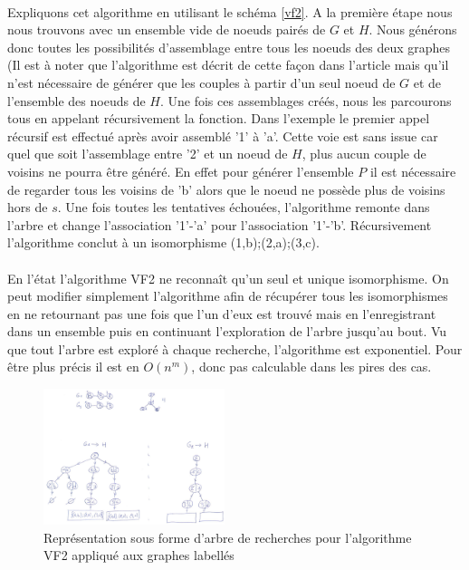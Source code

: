 \documentclass[12pt,french,twoside]{report}
\begin{document}
\paragraph{}Expliquons cet algorithme en utilisant le schéma \ref{vf2}.
A la première étape nous nous trouvons avec un ensemble vide de noeuds pairés de $G$ et $H$.
Nous générons donc toutes les possibilités d'assemblage entre tous les noeuds des deux graphes (Il est à noter que l'algorithme
est décrit de cette façon dans l'article mais qu'il n'est nécessaire de générer que les couples à partir d'un seul noeud de $G$
et de l'ensemble des noeuds de $H$.
Une fois ces assemblages créés, nous les parcourons tous en appelant récursivement la fonction.
Dans l'exemple le premier appel récursif est effectué après avoir assemblé '1' à 'a'.
Cette voie est sans issue car quel que soit l'assemblage entre '2' et un noeud de $H$, plus aucun couple de voisins ne pourra être
généré.
En effet pour générer l'ensemble $P$ il est nécessaire de regarder tous les voisins de 'b' alors que le noeud ne possède plus
de voisins hors de $s$.
Une fois toutes les tentatives échouées, l'algorithme remonte dans l'arbre et change l'association '1'-'a' pour l'association
'1'-'b'.
Récursivement l'algorithme conclut à un isomorphisme {(1,b);(2,a);(3,c)}.

\paragraph{}En l'état l'algorithme VF2 ne reconnaît qu'un seul et unique isomorphisme.
On peut modifier simplement l'algorithme afin de récupérer tous les isomorphismes en ne retournant pas une fois que l'un d'eux est
trouvé mais en l'enregistrant dans un ensemble puis en continuant l'exploration de l'arbre jusqu'au bout.
Vu que tout l'arbre est exploré à chaque recherche, l'algorithme est exponentiel.
Pour être plus précis il est en $O(n^m)$, donc pas calculable dans les pires des cas.

\begin{figure}
  \includegraphics[width=200px]{Figures/s2m/recherche/VF2_labels.pdf}
  \caption{\label{vf2_labels}Représentation sous forme d'arbre de recherches pour l'algorithme VF2 appliqué aux graphes labellés}
\end{figure}
\end{document}
